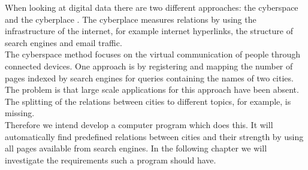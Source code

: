 When looking at digital data there are two different approaches: the cyberspace and the cyberplace \cite{devriendt2008cyberplace}. The cyberplace measures relations by using the infrastructure of the internet, for example internet hyperlinks, the structure of search engines and email traffic.\\
The cyberspace method focuses on the virtual communication of people through connected devices. One approach is by registering and mapping the number of pages indexed by search engines for queries containing the names of two cities. The problem is that large scale applications for this approach have been absent. The splitting of the relations between cities to different topics, for example, is missing. \\

Therefore we intend develop a computer program which does this. It will automatically find predefined relations between cities and their strength by using all pages available from search engines. In the following chapter we will investigate the requirements such a program should have.

